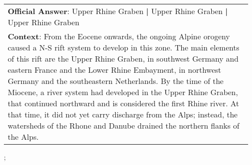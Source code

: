 \begin{figure*}[ht]
{\begin{tabular}{p{}}
            \textbf{Official Answer}: Upper Rhine Graben \textbf{|} Upper Rhine Graben \textbf{|} Upper Rhine Graben                                                                                                                                                                                                                                                                                                                                                                                                                                                                                                                    \\
            \textbf{Context}: From the Eocene onwards, the ongoing Alpine orogeny caused a N-S rift system to develop in this zone. The main elements of this rift are the Upper Rhine Graben, in southwest Germany and eastern France and the Lower Rhine Embayment, in northwest Germany and the southeastern Netherlands. By the time of the Miocene, a river system had developed in the Upper Rhine Graben, that continued northward and is considered the first Rhine river. At that time, it did not yet carry discharge from the Alps; instead, the watersheds of the Rhone and Danube drained the northern flanks of the Alps. \\
        \end{tabular}
    };
    \label{fig:ex-572ffb02b2c2fd14005686b8}
\end{figure*}

